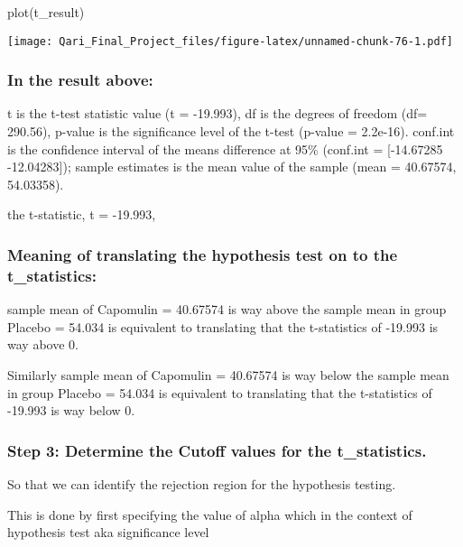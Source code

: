 \documentclass[
]{article}
\newenvironment{Shaded}{\begin{snugshade}}{\end{snugshade}}
\newcommand{\FunctionTok}[1]{\textcolor[rgb]{0.00,0.00,0.00}{#1}}
\newcommand{\NormalTok}[1]{#1}
\begin{document}
\begin{Shaded}
\begin{Highlighting}[]
\FunctionTok{plot}\NormalTok{(t\_result)}
\end{Highlighting}
\end{Shaded}

\texttt{[image: Qari\_Final\_Project\_files/figure-latex/unnamed-chunk-76-1.pdf]}

\hypertarget{in-the-result-above}{%
\subsubsection{In the result above:}\label{in-the-result-above}}

t is the t-test statistic value (t = -19.993), df is the degrees of
freedom (df= 290.56), p-value is the significance level of the t-test
(p-value = 2.2e-16). conf.int is the confidence interval of the means
difference at 95\% (conf.int = {[}-14.67285 -12.04283{]}); sample
estimates is the mean value of the sample (mean = 40.67574, 54.03358).

the t-statistic, t = -19.993,

\hypertarget{meaning-of-translating-the-hypothesis-test-on-to-the-t_statistics}{%
\subsubsection{Meaning of translating the hypothesis test on to the
t\_statistics:}\label{meaning-of-translating-the-hypothesis-test-on-to-the-t_statistics}}

sample mean of Capomulin = 40.67574 is way above the sample mean in
group Placebo = 54.034 is equivalent to translating that the
t-statistics of -19.993 is way above 0.

Similarly sample mean of Capomulin = 40.67574 is way below the sample
mean in group Placebo = 54.034 is equivalent to translating that the
t-statistics of -19.993 is way below 0.

\hypertarget{step-3-determine-the-cutoff-values-for-the-t_statistics.}{%
\subsubsection{Step 3: Determine the Cutoff values for the
t\_statistics.}\label{step-3-determine-the-cutoff-values-for-the-t_statistics.}}

So that we can identify the rejection region for the hypothesis testing.

This is done by first specifying the value of alpha which in the context
of hypothesis test aka significance level
\end{document}
